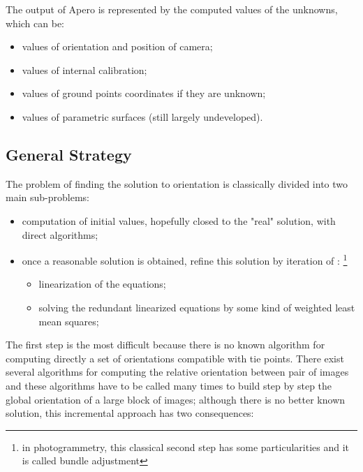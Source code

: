 The output of Apero is represented by the computed values of the unknowns,
which can be:

\begin{itemize}
    \item  values of  orientation and position of camera;

    \item  values of  internal calibration;

    \item  values of  ground points coordinates if they are unknown;

    \item  values of  parametric surfaces (still largely undeveloped).

\end{itemize}


\subsection{General Strategy}

The problem of finding the solution  to orientation is classically divided
into two main sub-problems:


\begin{itemize}
    \item  computation of initial values, hopefully closed to the "real" solution,
           with direct algorithms;

    \item  once a reasonable solution is obtained, refine this solution by iteration of :
            \footnote{in photogrammetry, this classical second step has some particularities and it is called bundle adjustment}


\begin{itemize}
       \item linearization of the equations;
       \item solving the redundant linearized equations by some kind of weighted least mean squares;
\end{itemize}

\end{itemize}

The first step is the most difficult because there is no known algorithm
for computing directly  a set of orientations compatible with tie points.
There exist several algorithms for computing the relative orientation between
pair of images and these algorithms have to be called many times to build
step by step the global orientation of a large block of images;
although there is no better known solution,
this incremental approach has two consequences:

